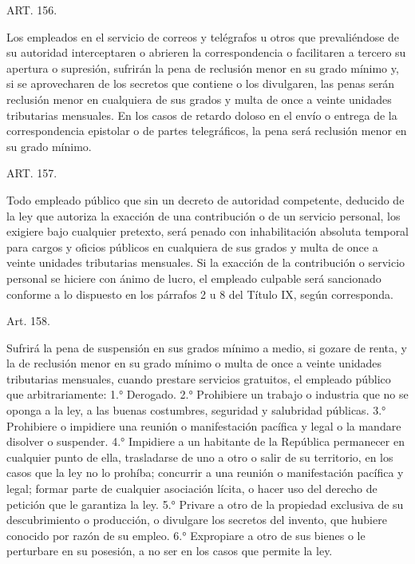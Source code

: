     ART. 156.

    Los empleados en el servicio de correos y telégrafos u otros que prevaliéndose de su autoridad interceptaren o abrieren la correspondencia o facilitaren a tercero su apertura o supresión, sufrirán la pena de reclusión menor en su grado mínimo y, si se aprovecharen de los secretos que contiene o los divulgaren, las penas serán reclusión menor en cualquiera de sus grados y multa de once a veinte unidades tributarias mensuales.
    En los casos de retardo doloso en el envío o entrega de la correspondencia epistolar o de partes telegráficos, la pena será reclusión menor en su grado mínimo.





    ART. 157.

    Todo empleado público que sin un decreto de autoridad competente, deducido de la ley que autoriza la exacción de una contribución o de un servicio personal, los exigiere bajo cualquier pretexto, será penado con inhabilitación absoluta temporal para cargos y oficios públicos en cualquiera de sus grados y multa de once a veinte unidades tributarias mensuales.
    Si la exacción de la contribución o servicio personal se hiciere con ánimo de lucro, el empleado culpable será sancionado conforme a lo dispuesto en los párrafos 2 u 8 del Título IX, según corresponda.


    Art. 158.

    Sufrirá la pena de suspensión en sus grados mínimo a medio, si gozare de renta, y la de reclusión menor en su grado mínimo o multa de once a veinte unidades tributarias mensuales, cuando prestare servicios gratuitos, el empleado público que arbitrariamente:
    1.° Derogado.
    2.° Prohibiere un trabajo o industria que no se oponga a la ley, a las buenas costumbres, seguridad y salubridad públicas.
    3.° Prohibiere o impidiere una reunión o manifestación pacífica y legal o la mandare disolver o suspender.
    4.° Impidiere a un habitante de la República permanecer en cualquier punto de ella, trasladarse de uno a otro o salir de su territorio, en los casos que la ley no lo prohíba; concurrir a una reunión o manifestación pacífica y legal; formar parte de cualquier asociación lícita, o hacer uso del derecho de petición que le garantiza la ley.
    5.° Privare a otro de la propiedad exclusiva de su descubrimiento o producción, o divulgare los secretos del invento, que hubiere conocido por razón de su empleo.
    6.° Expropiare a otro de sus bienes o le perturbare en su posesión, a no ser en los casos que permite la ley.







